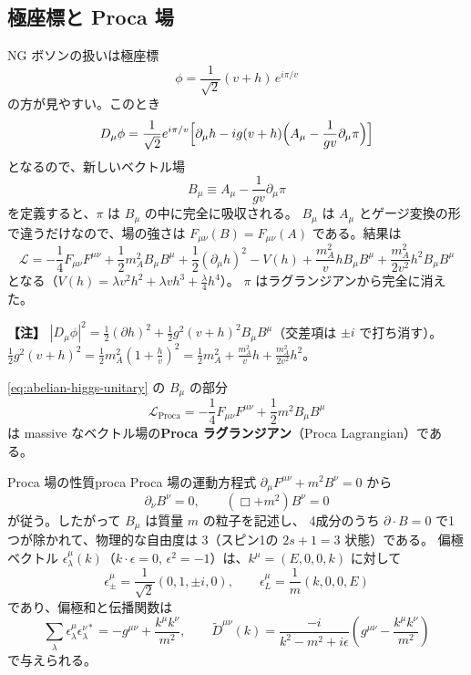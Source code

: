 \documentclass[uplatex,dvipdfmx,a4paper,11pt,openany]{jsbook}
\newcommand{\term}[2]{\textbf{#1}（#2）}
\newenvironment{note}{\vspace{1ex}\par\footnotesize\noindent\textbf{【注】}}{\par\vspace{1ex}}
\numberwithin{equation}{chapter}
\theoremstyle{definition}
\theoremstyle{plain}
\theoremstyle{remark}
\newcommand{\Lag}{\mathcal{L}}
\begin{document}
\subsection{極座標と Proca 場}
NG ボソンの扱いは極座標
\begin{equation}
\phi=\frac{1}{\sqrt2}(v+h)\,e^{i\pi/v}
\end{equation}
の方が見やすい。このとき
\begin{equation}
D_\mu\phi=\frac{1}{\sqrt2}e^{i\pi/v}\Bigl[\partial_\mu h-ig(v+h)\Bigl(A_\mu-\frac{1}{gv}\partial_\mu\pi\Bigr)\Bigr]
\end{equation}
となるので、新しいベクトル場
\begin{equation}
B_\mu\equiv A_\mu-\frac{1}{gv}\partial_\mu\pi
\label{eq:Bmu}
\end{equation}
を定義すると、$\pi$ は $B_\mu$ の中に完全に吸収される。
$B_\mu$ は $A_\mu$ とゲージ変換の形で違うだけなので、場の強さは $F_{\mu\nu}(B)=F_{\mu\nu}(A)$ である。結果は
\begin{equation}
\Lag=-\frac14F_{\mu\nu}F^{\mu\nu}+\frac12m_A^2B_\mu B^\mu
+\frac12(\partial_\mu h)^2-V(h)
+\frac{m_A^2}{v}hB_\mu B^\mu+\frac{m_A^2}{2v^2}h^2B_\mu B^\mu
\label{eq:abelian-higgs-unitary}
\end{equation}
となる（$V(h)=\lambda v^2h^2+\lambda vh^3+\frac\lambda4h^4$）。
$\pi$ はラグランジアンから完全に消えた。
\begin{note}
$|D_\mu\phi|^2=\frac12(\partial h)^2+\frac12g^2(v+h)^2B_\mu B^\mu$（交差項は $\pm i$ で打ち消す）。
$\frac12g^2(v+h)^2=\frac12m_A^2\left(1+\frac hv\right)^2=\frac12m_A^2+\frac{m_A^2}{v}h+\frac{m_A^2}{2v^2}h^2$。
\end{note}
\eqref{eq:abelian-higgs-unitary} の $B_\mu$ の部分
\begin{equation}
\Lag_{\mathrm{Proca}}=-\frac14F_{\mu\nu}F^{\mu\nu}+\frac12m^2B_\mu B^\mu
\end{equation}
は massive なベクトル場の\term{Proca ラグランジアン}{Proca Lagrangian}である。
\begin{myprop}{Proca 場の性質}{proca}
Proca 場の運動方程式 $\partial_\mu F^{\mu\nu}+m^2B^\nu=0$ から
\begin{equation}
\partial_\nu B^\nu=0,\qquad(\Box+m^2)B^\nu=0
\end{equation}
が従う。したがって $B_\mu$ は質量 $m$ の粒子を記述し、
4成分のうち $\partial\cdot B=0$ で1つが除かれて、物理的な自由度は $3$（スピン1の $2s+1=3$ 状態）である。
偏極ベクトル $\epsilon^\mu_\lambda(k)$（$k\cdot\epsilon=0$, $\epsilon^2=-1$）は、$k^\mu=(E,0,0,k)$ に対して
\begin{equation}
\epsilon^\mu_\pm=\frac{1}{\sqrt2}(0,1,\pm i,0),\qquad
\epsilon^\mu_L=\frac1m(k,0,0,E)
\label{eq:polarization}
\end{equation}
であり、偏極和と伝播関数は
\begin{equation}
\sum_\lambda\epsilon^\mu_\lambda\epsilon^{\nu*}_\lambda=-g^{\mu\nu}+\frac{k^\mu k^\nu}{m^2},
\qquad
\tilde D^{\mu\nu}(k)=\frac{-i}{k^2-m^2+i\epsilon}\left(g^{\mu\nu}-\frac{k^\mu k^\nu}{m^2}\right)
\label{eq:proca-propagator}
\end{equation}
で与えられる。
\end{myprop}
\end{document}
